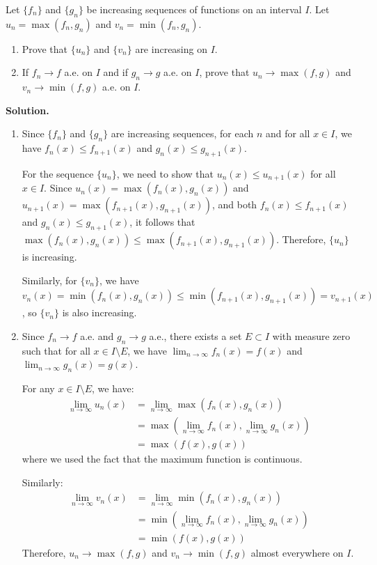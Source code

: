 \begin{problembox}
Let $\{f_n\}$ and $\{g_n\}$ be increasing sequences of functions on an interval $I$. Let $u_n = \max(f_n, g_n)$ and $v_n = \min(f_n, g_n)$.
\begin{enumerate}[label=(\alph*)]
    \item Prove that $\{u_n\}$ and $\{v_n\}$ are increasing on $I$.
    \item If $f_n \to f$ a.e. on $I$ and if $g_n \to g$ a.e. on $I$, prove that $u_n \to \max(f, g)$ and $v_n \to \min(f, g)$ a.e. on $I$.
\end{enumerate}
\end{problembox}

\noindent\textbf{Solution.}
\begin{enumerate}[label=(\alph*)]
    \item Since $\{f_n\}$ and $\{g_n\}$ are increasing sequences, for each $n$ and for all $x \in I$, we have $f_n(x) \leq f_{n+1}(x)$ and $g_n(x) \leq g_{n+1}(x)$. 

    For the sequence $\{u_n\}$, we need to show that $u_n(x) \leq u_{n+1}(x)$ for all $x \in I$. Since $u_n(x) = \max(f_n(x), g_n(x))$ and $u_{n+1}(x) = \max(f_{n+1}(x), g_{n+1}(x))$, and both $f_n(x) \leq f_{n+1}(x)$ and $g_n(x) \leq g_{n+1}(x)$, it follows that $\max(f_n(x), g_n(x)) \leq \max(f_{n+1}(x), g_{n+1}(x))$. Therefore, $\{u_n\}$ is increasing.

    Similarly, for $\{v_n\}$, we have $v_n(x) = \min(f_n(x), g_n(x)) \leq \min(f_{n+1}(x), g_{n+1}(x)) = v_{n+1}(x)$, so $\{v_n\}$ is also increasing.

    \item Since $f_n \to f$ a.e. and $g_n \to g$ a.e., there exists a set $E \subset I$ with measure zero such that for all $x \in I \setminus E$, we have $\lim_{n \to \infty} f_n(x) = f(x)$ and $\lim_{n \to \infty} g_n(x) = g(x)$.

    For any $x \in I \setminus E$, we have:
    \begin{align*}
    \lim_{n \to \infty} u_n(x) &= \lim_{n \to \infty} \max(f_n(x), g_n(x)) \\
    &= \max(\lim_{n \to \infty} f_n(x), \lim_{n \to \infty} g_n(x)) \\
    &= \max(f(x), g(x))
    \end{align*}
    where we used the fact that the maximum function is continuous.

    Similarly:
    \begin{align*}
    \lim_{n \to \infty} v_n(x) &= \lim_{n \to \infty} \min(f_n(x), g_n(x)) \\
    &= \min(\lim_{n \to \infty} f_n(x), \lim_{n \to \infty} g_n(x)) \\
    &= \min(f(x), g(x))
    \end{align*}
    Therefore, $u_n \to \max(f, g)$ and $v_n \to \min(f, g)$ almost everywhere on $I$.
\end{enumerate}

